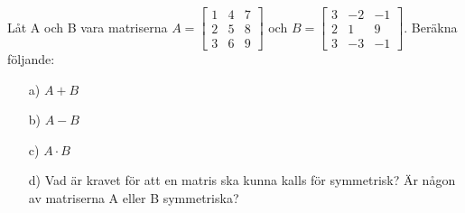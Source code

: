 Låt A och B vara matriserna $A=\begin{bmatrix}1 & 4 & 7\\ 2 & 5 & 8 \\ 3 & 6 & 9\end{bmatrix}$ och $B=\begin{bmatrix}3 & -2 & -1\\ 2 & 1 & 9 \\ 3 & -3 & -1\end{bmatrix}$. Beräkna följande:

\begin{itemize}
	\item[a) ] $A+B$
	\item[b) ] $A-B$
	\item[c) ] $A \cdot B$
	\item[d) ] Vad är kravet för att en matris ska kunna kalls för symmetrisk? Är någon av matriserna A eller B symmetriska?
\end{itemize}
